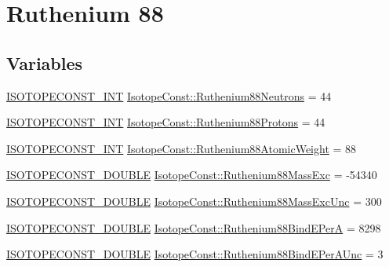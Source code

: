 \hypertarget{group___isotope_const-_ruthenium-_ru88}{}\section{Ruthenium 88}
\label{group___isotope_const-_ruthenium-_ru88}
\subsection*{Variables}
\begin{DoxyCompactItemize}
\item 
\mbox{\hyperlink{group___isotope_const-_macros_ga5f18360b3e99483a35c32d789e62621c}{I\+S\+O\+T\+O\+P\+E\+C\+O\+N\+S\+T\+\_\+\+I\+NT}} \mbox{\hyperlink{group___isotope_const-_ruthenium-_ru88_ga0ceccd75dda897fb84d4cb03997ec12b}{Isotope\+Const\+::\+Ruthenium88\+Neutrons}} = 44
\item 
\mbox{\hyperlink{group___isotope_const-_macros_ga5f18360b3e99483a35c32d789e62621c}{I\+S\+O\+T\+O\+P\+E\+C\+O\+N\+S\+T\+\_\+\+I\+NT}} \mbox{\hyperlink{group___isotope_const-_ruthenium-_ru88_ga38ee38f6628feeb02cb86878728cb40a}{Isotope\+Const\+::\+Ruthenium88\+Protons}} = 44
\item 
\mbox{\hyperlink{group___isotope_const-_macros_ga5f18360b3e99483a35c32d789e62621c}{I\+S\+O\+T\+O\+P\+E\+C\+O\+N\+S\+T\+\_\+\+I\+NT}} \mbox{\hyperlink{group___isotope_const-_ruthenium-_ru88_gae27fc972a298234b8a7b994806b57fc9}{Isotope\+Const\+::\+Ruthenium88\+Atomic\+Weight}} = 88
\item 
\mbox{\hyperlink{group___isotope_const-_macros_ga8f45a7272ce02c0b4c65c44636ed719a}{I\+S\+O\+T\+O\+P\+E\+C\+O\+N\+S\+T\+\_\+\+D\+O\+U\+B\+LE}} \mbox{\hyperlink{group___isotope_const-_ruthenium-_ru88_gad25c0ff8fa58ad6629f7ade4a6bb089f}{Isotope\+Const\+::\+Ruthenium88\+Mass\+Exc}} = -\/54340
\item 
\mbox{\hyperlink{group___isotope_const-_macros_ga8f45a7272ce02c0b4c65c44636ed719a}{I\+S\+O\+T\+O\+P\+E\+C\+O\+N\+S\+T\+\_\+\+D\+O\+U\+B\+LE}} \mbox{\hyperlink{group___isotope_const-_ruthenium-_ru88_gae9dd1642c2a48bbcf8a94572db25c9a7}{Isotope\+Const\+::\+Ruthenium88\+Mass\+Exc\+Unc}} = 300
\item 
\mbox{\hyperlink{group___isotope_const-_macros_ga8f45a7272ce02c0b4c65c44636ed719a}{I\+S\+O\+T\+O\+P\+E\+C\+O\+N\+S\+T\+\_\+\+D\+O\+U\+B\+LE}} \mbox{\hyperlink{group___isotope_const-_ruthenium-_ru88_ga3f7a877ee658195dc64412fd0d02d599}{Isotope\+Const\+::\+Ruthenium88\+Bind\+E\+PerA}} = 8298
\item 
\mbox{\hyperlink{group___isotope_const-_macros_ga8f45a7272ce02c0b4c65c44636ed719a}{I\+S\+O\+T\+O\+P\+E\+C\+O\+N\+S\+T\+\_\+\+D\+O\+U\+B\+LE}} \mbox{\hyperlink{group___isotope_const-_ruthenium-_ru88_gadd78fb4e127db00d2fd5a36c7215553f}{Isotope\+Const\+::\+Ruthenium88\+Bind\+E\+Per\+A\+Unc}} = 3

\end{DoxyCompactItemize}
